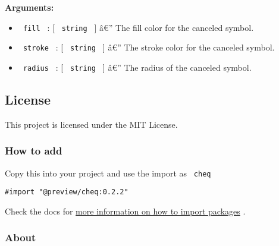 \begin{Shaded}
\begin{Highlighting}[]
\end{Highlighting}
\end{Shaded}

\textbf{Arguments:}

\begin{itemize}
\tightlist
\item
  \texttt{\ fill\ } : {[} \texttt{\ string\ } {]} â€'' The fill color
  for the canceled symbol.
\item
  \texttt{\ stroke\ } : {[} \texttt{\ string\ } {]} â€'' The stroke
  color for the canceled symbol.
\item
  \texttt{\ radius\ } : {[} \texttt{\ string\ } {]} â€'' The radius of
  the canceled symbol.
\end{itemize}

\subsection{License}\label{license}

This project is licensed under the MIT License.

\subsubsection{How to add}\label{how-to-add}

Copy this into your project and use the import as \texttt{\ cheq\ }

\begin{verbatim}
#import "@preview/cheq:0.2.2"
\end{verbatim}



Check the docs for
\href{https://typst.app/docs/reference/scripting/\#packages}{more
information on how to import packages} .

\subsubsection{About}\label{about}

